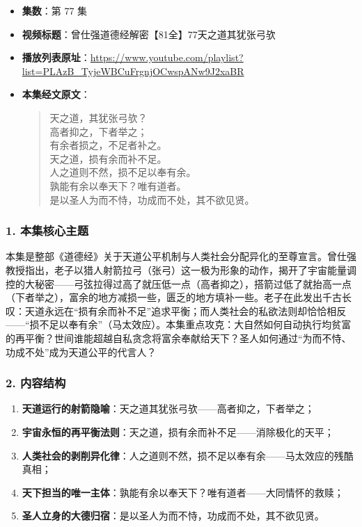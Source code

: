 \begin{itemize}
    \item \textbf{集数}：第 77 集
    \item \textbf{视频标题}：曾仕强道德经解密【81全】77天之道其犹张弓欤
    \item \textbf{播放列表原址}：\url{https://www.youtube.com/playlist?list=PLAzB_TyjeWBCuFrgnjOCwspANw9J2xaBR}
    \item \textbf{本集经文原文}：
    \begin{quote}\kaishu
    天之道，其犹张弓欤？\\
    高者抑之，下者举之；\\
    有余者损之，不足者补之。\\
    天之道，损有余而补不足。\\
    人之道则不然，损不足以奉有余。\\
    孰能有余以奉天下？唯有道者。\\
    是以圣人为而不恃，功成而不处，其不欲见贤。
    \end{quote}
\end{itemize}

\subsubsection{1. 本集核心主题}
本集是整部《道德经》关于天道公平机制与人类社会分配异化的至尊宣言。曾仕强教授指出，老子以猎人射箭拉弓（张弓）这一极为形象的动作，揭开了宇宙能量调控的大秘密——弓弦拉得过高了就压低一点（高者抑之），搭箭过低了就抬高一点（下者举之），富余的地方减损一些，匮乏的地方填补一些。老子在此发出千古长叹：天道永远在“损有余而补不足”追求平衡；而人类社会的私欲法则却恰恰相反——“损不足以奉有余”（马太效应）。本集重点攻克：大自然如何自动执行均贫富的再平衡？世间谁能超越自私贪念将富余奉献给天下？圣人如何通过“为而不恃、功成不处”成为天道公平的代言人？

\subsubsection{2. 内容结构}
\begin{enumerate}
    \item \textbf{天道运行的射箭隐喻}：天之道其犹张弓欤——高者抑之，下者举之；
    \item \textbf{宇宙永恒的再平衡法则}：天之道，损有余而补不足——消除极化的天平；
    \item \textbf{人类社会的剥削异化律}：人之道则不然，损不足以奉有余——马太效应的残酷真相；
    \item \textbf{天下担当的唯一主体}：孰能有余以奉天下？唯有道者——大同情怀的救赎；
    \item \textbf{圣人立身的大德归宿}：是以圣人为而不恃，功成而不处，其不欲见贤。
\end{enumerate}

